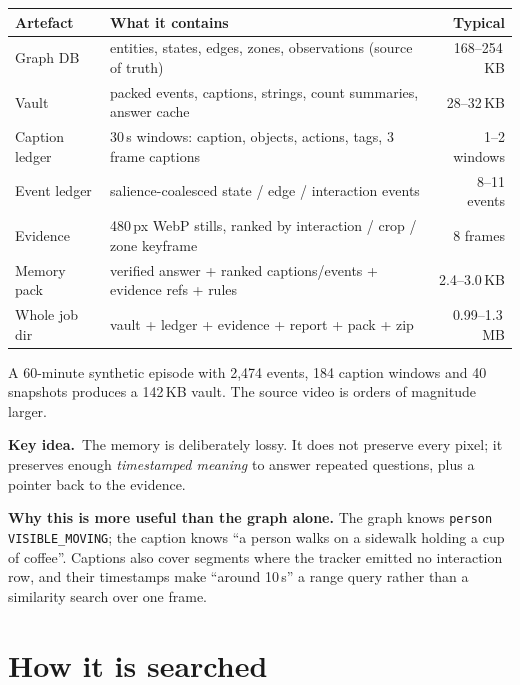 \documentclass[10pt,a4paper]{article}
\newcommand{\code}[1]{\texttt{\small #1}}
\newcommand{\panel}[1]{%
  \noindent\colorbox{panel}{%
    \begin{minipage}{\dimexpr\linewidth-2\fboxsep\relax}
    \vspace{2pt}#1\vspace{2pt}
    \end{minipage}}%
}
\newcommand{\keyidea}[1]{%
  \par\medskip\noindent\colorbox{panel}{%
    \begin{minipage}{\dimexpr\linewidth-2\fboxsep\relax}
    \vspace{2pt}\textbf{\textcolor{accent}{Key idea.}}\ #1\vspace{2pt}
    \end{minipage}}\par\medskip
}
\begin{document}
\begin{center}
\small
\begin{tabularx}{\linewidth}{@{}l L r@{}}
\toprule
\textbf{Artefact} & \textbf{What it contains} & \textbf{Typical} \\
\midrule
Graph DB & entities, states, edges, zones, observations (source of truth) & 168--254\,KB \\
Vault & packed events, captions, strings, count summaries, answer cache & 28--32\,KB \\
Caption ledger & 30\,s windows: caption, objects, actions, tags, 3 frame captions & 1--2 windows \\
Event ledger & salience-coalesced state / edge / interaction events & 8--11 events \\
Evidence & 480\,px WebP stills, ranked by interaction / crop / zone keyframe & 8 frames \\
Memory pack & verified answer + ranked captions/events + evidence refs + rules & 2.4--3.0\,KB \\
Whole job dir & vault + ledger + evidence + report + pack + zip & 0.99--1.3\,MB \\
\bottomrule
\end{tabularx}
\end{center}

\noindent
A 60-minute synthetic episode with 2{,}474 events, 184 caption windows and 40 snapshots produces a
142\,KB vault. The source video is orders of magnitude larger.

\keyidea{The memory is deliberately lossy. It does not preserve every pixel; it preserves enough
\emph{timestamped meaning} to answer repeated questions, plus a pointer back to the evidence.}

\vspace{2pt}

\panel{
\textbf{Why this is more useful than the graph alone.} The graph knows \code{person
VISIBLE\_MOVING}; the caption knows ``a person walks on a sidewalk holding a cup of coffee''. Captions
also cover segments where the tracker emitted no interaction row, and their timestamps make ``around
10\,s'' a range query rather than a similarity search over one frame.
}

\section{How it is searched}
\end{document}
